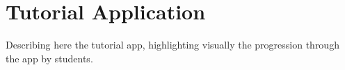 \section{Tutorial Application}\label{chap:tutorial}

Describing here the tutorial app, highlighting visually the progression through the app by students.